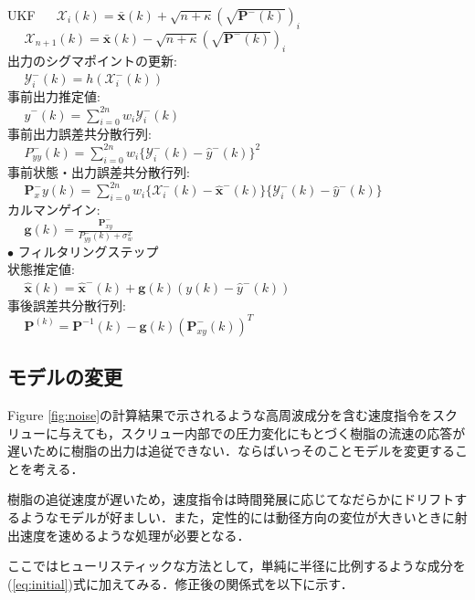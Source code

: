 \documentclass[twocolumn,oneside,a4paper]{article}
\begin{document}
\begin{breakitembox}[l]{UKF}
	$\:\:\:\:\:\: \mathscr{X}_i(k) = \bar{\bm{x}}(k) + \sqrt{n+\kappa}(\sqrt{\bm{P}^{-}(k)})_i $ \\
	$\:\:\:\:\:\: \mathscr{X}_{n+1}(k) = \bar{\bm{x}}(k) - \sqrt{n+\kappa}(\sqrt{\bm{P}^{-}(k)})_i $ \\
     出力のシグマポイントの更新: \\
     $\:\:\:\:\:\: \mathscr{Y}_i^{-}(k) = h(\mathscr{X}_i^{-}(k))$ \\
     事前出力推定値: \\
     $\:\:\:\:\:\: \hat{y}^{-}(k) = \sum_{i=0}^{2n} w_i \mathscr{Y}_{i}^{-} (k) $ \\
     事前出力誤差共分散行列: \\
     $\:\:\:\:\:\: P^{-}_{yy}(k) = \sum_{i=0}^{2n} w_i \{\mathscr{Y}_i^{-}(k) - \hat{y}^{-}(k)\}^2$ \\
     事前状態・出力誤差共分散行列: \\
     $\:\:\:\:\:\: \bm{P}^{-}_xy(k) = \sum_{i=0}^{2n} w_i \{ \mathscr{X}_i^{-}(k) - \hat{\bm{x}}^{-}(k)\} \{\mathscr{Y}_i^{-}(k) - \hat{y}^{-}(k)\} $ \\
     カルマンゲイン: \\
     $\:\:\:\:\:\: \bm{g}(k)= \frac{\bm{P}^{-}_{xy}} {P_{yy}^{-}(k) + \sigma_w^2} $\\
     $\bullet$ フィルタリングステップ\\
     状態推定値: \\
     $\:\:\:\:\:\: \hat{\bm{x}}(k) = \hat{\bm{x}}^{-}(k) + \bm{g}(k)(y(k)-\hat{y}^{-}(k))$\\
     事後誤差共分散行列: \\
     $\:\:\:\:\:\: \bm{P}^(k)=\bm{P}^{-1}(k) - \bm{g}(k)(\bm{P}^{-}_{xy}(k))^T$
  \end{breakitembox}


\subsection{モデルの変更}
Figure \ref{fig:noise}の計算結果で示されるような高周波成分を含む速度指令をスクリューに与えても，スクリュー内部での圧力変化にもとづく樹脂の流速の応答が遅いために樹脂の出力は追従できない．ならばいっそのことモデルを変更することを考える．

樹脂の追従速度が遅いため，速度指令は時間発展に応じてなだらかにドリフトするようなモデルが好ましい．また，定性的には動径方向の変位が大きいときに射出速度を速めるような処理が必要となる．

ここではヒューリスティックな方法として，単純に半径に比例するような成分を(\ref{eq:initial})式に加えてみる．修正後の関係式を以下に示す．
\end{document}
